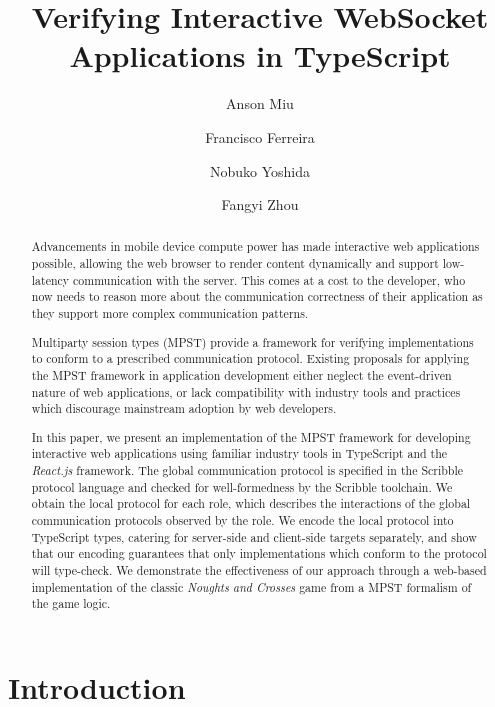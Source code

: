 \documentclass[submission,copyright,creativecommons]{eptcs}
\title{Verifying Interactive WebSocket Applications in TypeScript}
\author{Anson Miu
\institute{Imperial College London}
\and
Francisco Ferreira
\institute{Imperial College London}
\and
Nobuko Yoshida
\institute{Imperial College London}
\and
Fangyi Zhou
\institute{Imperial College London}
}
\begin{document}
\maketitle

\begin{abstract}
Advancements in mobile device compute power has made interactive web applications possible, allowing the web browser to render content dynamically and support low-latency communication with the server. This comes at a cost to the developer, who now needs to reason more about the communication correctness of their application as they support more complex communication patterns. 

Multiparty session types (MPST) provide a framework for verifying implementations to conform to a prescribed communication protocol. Existing proposals for applying the MPST framework in application development either neglect the event-driven nature of web applications, or lack compatibility with industry tools and practices which discourage mainstream adoption by web developers.

In this paper, we present an implementation of the MPST framework for developing interactive web applications using familiar industry tools in TypeScript and the \textit{React.js} framework. The global communication protocol is specified in the Scribble protocol language and checked for well-formedness by the Scribble toolchain. We obtain the local protocol for each role, which describes the interactions of the global communication protocols observed by the role. We encode the local protocol into TypeScript types, catering for server-side and client-side targets separately, and show that our encoding guarantees that only implementations which conform to the protocol will type-check. We demonstrate the effectiveness of our approach through a web-based implementation of the classic \textit{Noughts and Crosses} game from a MPST formalism of the game logic.

\end{abstract}

\section{Introduction}
\end{document}
